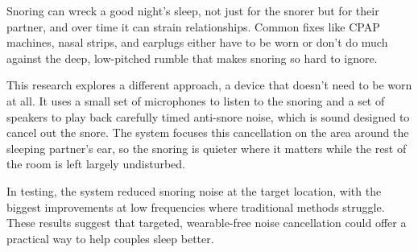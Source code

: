 %
%
%

\begin{publicabstract}

Snoring can wreck a good night's sleep, not just for the snorer but for their partner, and over time it can strain relationships. Common fixes like CPAP machines, nasal strips, and earplugs either have to be worn or don't do much against the deep, low-pitched rumble that makes snoring so hard to ignore.

This research explores a different approach, a device that doesn't need to be worn at all. It uses a small set of microphones to listen to the snoring and a set of speakers to play back carefully timed anti-snore noise, which is sound designed to cancel out the snore. The system focuses this cancellation on the area around the sleeping partner's ear, so the snoring is quieter where it matters while the rest of the room is left largely undisturbed.

In testing, the system reduced snoring noise at the target location, with the biggest improvements at low frequencies where traditional methods struggle. These results suggest that targeted, wearable-free noise cancellation could offer a practical way to help couples sleep better.

\end{publicabstract}


